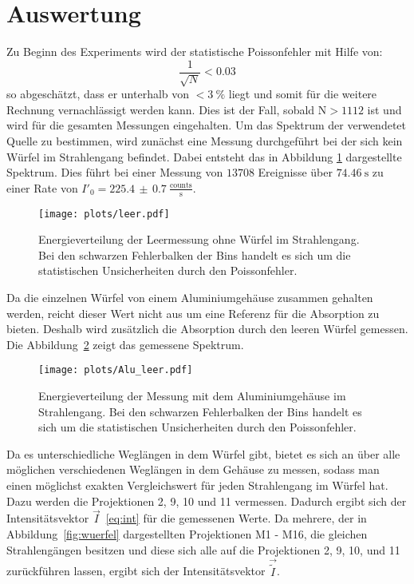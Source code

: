 \section{Auswertung}
Zu Beginn des Experiments wird der statistische Poissonfehler mit Hilfe von:
\begin{equation*}
  \frac{1}{\sqrt{N}} < 0.03
\end{equation*}
so abgeschätzt, dass er unterhalb von $<\SI{3}{\percent}$ liegt und somit für die weitere
Rechnung vernachlässigt werden kann. Dies ist der Fall, sobald $\text{N}>1112$
ist und wird für die gesamten Messungen eingehalten. Um das Spektrum der verwendetet
Quelle zu bestimmen, wird zunächst eine Messung durchgeführt bei der sich kein Würfel
im Strahlengang befindet. Dabei entsteht das in Abbildung \ref{fig:leer} dargestellte Spektrum.
Dies führt bei einer Messung von $13708$ Ereignisse über $\SI{74.46}{\second}$ zu einer
Rate von $I'_0 = 225.4\,\pm\,0.7\:\frac{\text{counts}}{\text{s}}$.

\begin{figure}
  \centering
  \texttt{[image: plots/leer.pdf]}
  \caption{Energieverteilung der Leermessung ohne Würfel im Strahlengang. Bei den schwarzen Fehlerbalken der Bins handelt es sich um die statistischen Unsicherheiten durch den Poissonfehler.}
  \label{fig:leer}
\end{figure}

Da die einzelnen Würfel von einem Aluminiumgehäuse zusammen gehalten werden, reicht dieser Wert nicht aus um
eine Referenz für die Absorption zu bieten. Deshalb wird zusätzlich die Absorption durch den leeren Würfel gemessen.
Die Abbildung~\ref{fig:alu} zeigt das gemessene Spektrum.

\begin{figure}
  \centering
  \texttt{[image: plots/Alu\_leer.pdf]}
  \caption{Energieverteilung der Messung mit dem Aluminiumgehäuse im Strahlengang.
  Bei den schwarzen Fehlerbalken der Bins handelt es sich um die statistischen Unsicherheiten durch den Poissonfehler.}
  \label{fig:alu}
\end{figure}

Da es unterschiedliche Weglängen in dem Würfel gibt, bietet es sich an über alle möglichen verschiedenen
Weglängen in dem Gehäuse zu messen, sodass man einen möglichst exakten Vergleichswert für jeden Strahlengang
im Würfel hat. Dazu werden die Projektionen 2, 9, 10 und 11 vermessen. Dadurch ergibt sich der Intensitätsvektor $\vec{I}$~\ref{eq:int}
für die gemessenen Werte. Da mehrere, der in Abbildung~\ref{fig:wuerfel} dargestellten Projektionen M1 - M16, die gleichen Strahlengängen
besitzen und diese sich alle auf die Projektionen 2, 9, 10, und 11 zurückführen lassen, ergibt sich der Intensitätsvektor $\vec{\tilde{I}}$.

